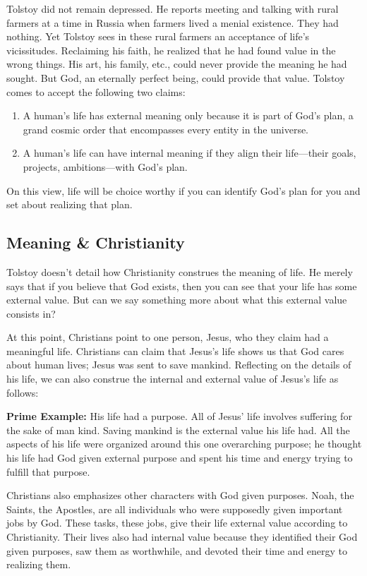 \documentclass[]{article}
\begin{document}
Tolstoy did not remain depressed. He reports meeting and talking with
rural farmers at a time in Russia when farmers lived a menial existence.
They had nothing. Yet Tolstoy sees in these rural farmers an acceptance
of life's vicissitudes. Reclaiming his faith, he realized that he had
found value in the wrong things. His art, his family, etc., could never
provide the meaning he had sought. But God, an eternally perfect being,
could provide that value. Tolstoy comes to accept the following two
claims:

\begin{enumerate}
\def\labelenumi{\arabic{enumi}.}
\item
  A human's life has external meaning only because it is part of God's
  plan, a grand cosmic order that encompasses every entity in the
  universe.
\item
  A human's life can have internal meaning if they align their
  life---their goals, projects, ambitions---with God's plan.
\end{enumerate}

On this view, life will be choice worthy if you can identify God's plan
for you and set about realizing that plan.

\subsection{Meaning \& Christianity}\label{meaning-christianity}

Tolstoy doesn't detail how Christianity construes the meaning of life.
He merely says that if you believe that God exists, then you can see
that your life has some external value. But can we say something more
about what this external value consists in?

At this point, Christians point to one person, Jesus, who they claim had
a meaningful life. Christians can claim that Jesus's life shows us that
God cares about human lives; Jesus was sent to save mankind. Reflecting
on the details of his life, we can also construe the internal and
external value of Jesus's life as follows:

\textbf{Prime Example:} His life had a purpose. All of Jesus' life
involves suffering for the sake of man kind. Saving mankind is the
external value his life had. All the aspects of his life were organized
around this one overarching purpose; he thought his life had God given
external purpose and spent his time and energy trying to fulfill that
purpose.

Christians also emphasizes other characters with God given purposes.
Noah, the Saints, the Apostles, are all individuals who were supposedly
given important jobs by God. These tasks, these jobs, give their life
external value according to Christianity. Their lives also had internal
value because they identified their God given purposes, saw them as
worthwhile, and devoted their time and energy to realizing them.
\end{document}
